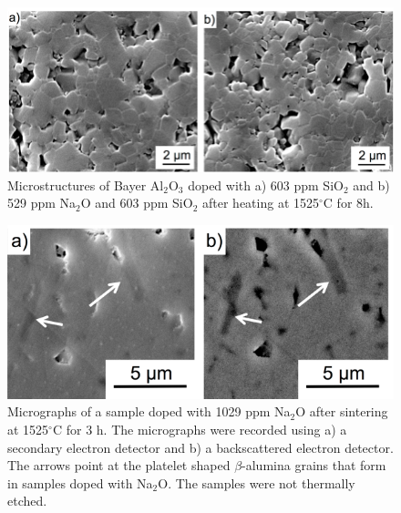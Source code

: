 \newpage
\begin{figure}[H]
	\centering
	\includegraphics[width=\textwidth]{Chapter-2/Figures/Figure7.png}
	\caption{Microstructures of Bayer Al$_{2}$O$_{3}$ doped with a) 603 ppm SiO$_{2}$ and b) 529 ppm Na$_{2}$O and 603 ppm SiO$_{2}$ after heating at 1525$^{\circ}$C for 8h.}
	\label{Ch2-figure:Figure7}
\end{figure}

\newpage
\begin{figure}[H]
	\centering
	\includegraphics[width=\textwidth]{Chapter-2/Figures/Figure8.png}
	\caption{Micrographs of a sample doped with 1029 ppm Na$_{2}$O after sintering at 1525$^{\circ}$C for 3 h. The micrographs were recorded using a) a secondary electron detector and b) a backscattered electron detector. The arrows point at the platelet shaped $\beta$-alumina grains that form in samples doped with Na$_{2}$O. The samples were not thermally etched.}
	\label{Ch2-figure:Figure8}
\end{figure}


